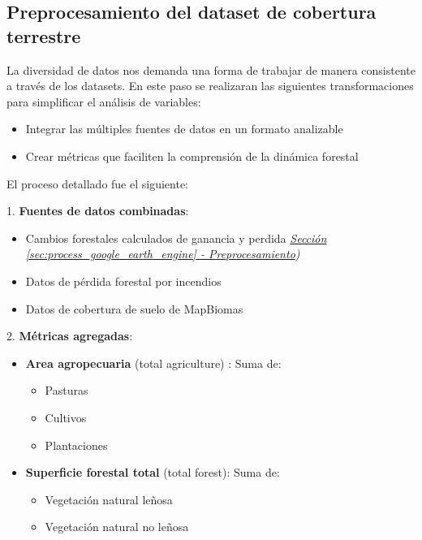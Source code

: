 \documentclass[11pt]{article}
\begin{document}
\subsection{Preprocesamiento del dataset de cobertura terrestre}

La diversidad de datos nos demanda una forma de trabajar de manera consistente a través de los datasets. En este paso se realizaran las siguientes transformaciones para simplificar el análisis de variables:

\begin{itemize}
    \item Integrar las múltiples fuentes de datos en un formato analizable
    \item Crear métricas que faciliten la comprensión de la dinámica forestal
\end{itemize}

El proceso detallado fue el siguiente:

1. \textbf{Fuentes de datos combinadas}:
   \begin{itemize}
       \item  Cambios forestales calculados de ganancia y perdida \textit{\hyperref[sec:preprocesamiento]{Sección \ref{sec:process_google_earth_engine} - Preprocesamiento})}
       \item Datos de pérdida forestal por incendios
       \item Datos de cobertura de suelo de MapBiomas
   \end{itemize}

2. \textbf{Métricas agregadas}:
\begin{itemize}
    \item \textbf{Area agropecuaria} (total agriculture) : Suma de:
            \begin{itemize}
                \item Pasturas
                \item Cultivos
                \item Plantaciones
            \end{itemize}
    \item \textbf{Superficie forestal total} (total forest): Suma de:
    \begin{itemize}
        \item Vegetación natural leñosa 
        \item Vegetación natural no leñosa 
    \end{itemize}
\end{itemize}
\end{document}
